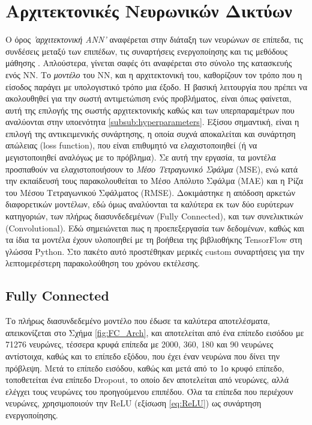 \section{Αρχιτεκτονικές Νευρωνικών Δικτύων}
\noindent

Ο όρος \textit{'αρχιτεκτονική ANN'} αναφέρεται στην διάταξη των νευρώνων σε επίπεδα, τις συνδέσεις μεταξύ των επιπέδων, τις συναρτήσεις ενεργοποίησης και τις μεθόδους μάθησης \cite{Kalogirou_2014}. Απλούστερα, γίνεται σαφές ότι αναφέρεται στο σύνολο της κατασκευής ενός NN. Το \textit{μοντέλο} του ΝΝ, και η αρχιτεκτονική του, καθορίζουν τον τρόπο που η είσοδος παράγει με υπολογιστικό τρόπο μια έξοδο. Η βασική λειτουργία που πρέπει να ακολουθηθεί για την σωστή αντιμετώπιση ενός προβλήματος, είναι όπως φαίνεται, αυτή της επιλογής της σωστής αρχιτεκτονικής καθώς και των υπερπαραμέτρων που αναλύονται στην υποενότητα \ref{subsub:hyperparameters}. Εξίσου σημαντική, είναι η επιλογή της αντικειμενικής συνάρτησης, η οποία συχνά αποκαλείται και συνάρτηση απώλειας (loss function), που είναι επιθυμητό να ελαχιστοποιηθεί (ή να μεγιστοποιηθεί αναλόγως με το πρόβλημα). Σε αυτή την εργασία, τα μοντέλα προσπαθούν να ελαχιστοποιήσουν το \textit{Μέσο Τετραγωνικό Σφάλμα} (MSE), ενώ κατά την εκπαίδευσή τους παρακολουθείται το Μέσο Απόλυτο Σφάλμα (MAE) και η Ρίζα του Μέσου Τετραγωνικού Σφάλματος (RMSE). Δοκιμάστηκε η απόδοση αρκετών διαφορετικών μοντέλων, εδώ όμως αναλύονται τα καλύτερα εκ των δύο ευρύτερων κατηγοριών, των πλήρως διασυνδεδεμένων (Fully Connected), και των συνελικτικών (Convolutional). Εδώ σημειώνεται πως η προεπεξεργασία των δεδομένων, καθώς και τα ίδια τα μοντέλα έχουν υλοποιηθεί με τη βοήθεια της βιβλιοθήκης TensorFlow στη γλώσσα Python. Στο πακέτο αυτό προστέθηκαν μερικές custom συναρτήσεις για την λεπτομερέστερη παρακολούθηση του χρόνου εκτέλεσης.

\subsection{Fully Connected}
Το πλήρως διασυνδεδεμένο μοντέλο που έδωσε τα καλύτερα αποτελέσματα, απεικονίζεται στο Σχήμα \ref{fig:FC_Arch}, και αποτελείται από ένα επίπεδο εισόδου με 71276 νευρώνες, τέσσερα κρυφά επίπεδα με 2000, 360, 180 και 90 νευρώνες αντίστοιχα, καθώς και το επίπεδο εξόδου, που έχει έναν νευρώνα που δίνει την πρόβλεψη. Μετά το επίπεδο εισόδου, καθώς και μετά από το 1ο κρυφό επίπεδο, τοποθετείται ένα επίπεδο Dropout, το οποίο δεν αποτελείται από νευρώνες, αλλά ελέγχει τους νευρώνες του προηγούμενου επιπέδου. Όλα τα επίπεδα που περιέχουν νευρώνες, χρησιμοποιούν την ReLU (εξίσωση \ref{eq:ReLU}) ως συνάρτηση ενεργοποίησης.

